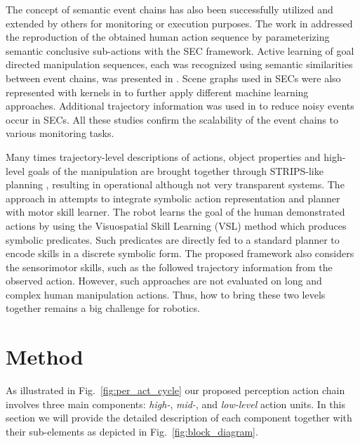   

The concept of semantic event chains has also  been successfully utilized and extended by others \cite{Waechter2013,Luo2011,Vuga2014,David2014} for monitoring or execution purposes. The work in \cite{Waechter2013} addressed the reproduction of the obtained human action sequence by parameterizing semantic conclusive sub-actions with the SEC framework.
Active learning of goal directed manipulation sequences, each was recognized using semantic similarities between event chains, was presented in \cite{David2014}. Scene graphs used in SECs were also represented with kernels in \cite{Luo2011} to further apply different machine learning approaches. Additional trajectory information was used in \cite{Vuga2014} to reduce noisy events occur in SECs. All these studies confirm the scalability of the event chains to various monitoring tasks.

Many times trajectory-level descriptions of actions, object properties and high-level goals of the manipulation are brought together through STRIPS-like planning \cite{Dillmann2010}, resulting in operational although not very transparent systems. The approach in \cite{Ahmadzadeh2015} attempts to integrate symbolic action 
representation and planner with motor skill learner. The robot learns the goal of the human demonstrated actions by using
the Visuospatial Skill Learning (VSL) method which produces symbolic predicates. Such predicates are directly fed to a standard planner to encode skills in a discrete symbolic form. The proposed framework also considers the sensorimotor skills, such as the followed trajectory information from
the observed action. However, such approaches are not evaluated on long and complex human manipulation actions. 
Thus, how to bring these two levels together remains a big challenge for robotics.




 






\clearpage  %

\section{Method}
\label{sec:method}

As illustrated in Fig.~\ref{fig:per_act_cycle} our proposed perception action chain involves three main components: {\it high-}, {\it mid-}, and {\it low-level} action units. In this section we will provide the detailed description of each component together with their sub-elements as depicted in Fig.~\ref{fig:block_diagram}.
  

